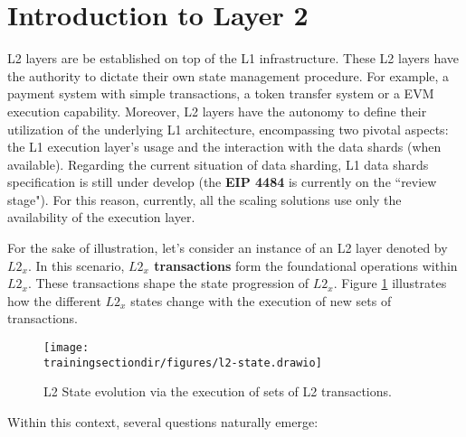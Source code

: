 

\section{Introduction to Layer 2}


L2 layers are be established on top of the L1 infrastructure. These L2 layers have the authority to dictate their own state management procedure. For example, a payment system with simple transactions, a token transfer system or a EVM execution capability. Moreover, L2 layers have the autonomy to define their utilization of the underlying L1 architecture, encompassing two pivotal aspects: the L1 execution layer's usage and the interaction with the data shards (when available). Regarding the current situation of data sharding, L1 data shards specification is still under develop (the \textbf{EIP 4484} is currently on the ``review stage"). For this reason, currently, all the scaling solutions use only the availability of the execution layer.

For the sake of illustration, let's consider an instance of an L2 layer denoted by $L2_x$. In this scenario, \textbf{$L2_x$ transactions} form the foundational operations within $L2_x$. These transactions shape the state progression of $L2_x$. Figure \ref{fig:l2-state-sequence} illustrates how the different $L2_x$ states change with the execution of new sets of transactions.

\begin{figure}[h]
\centering
\texttt{[image: \\trainingsectiondir/figures/l2-state.drawio]}
\caption{L2 State evolution via the execution of sets of L2 transactions.}
\label{fig:l2-state-sequence}
\end{figure}

Within this context, several questions naturally emerge:

